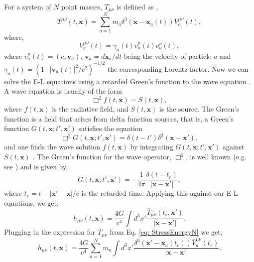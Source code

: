 \documentclass[12pt,a4paper]{report}
\theoremstyle{plain}
\theoremstyle{definition}
\theoremstyle{remark}
\newcommand{\munu}{\mu\nu}
\begin{document}
For a system of $N$ point masses, $T_{\munu}$ is defined as \cite{Christodoulou_2023b},
\begin{equation} \label{eq: StressEnergyN}
    T^{\mu \nu} (t,\bm{x}) = \sum_{a=1}^N m_a  \delta^{3} (\bm{x} - \bm{x}_a(t)) V_a^{\mu \nu} (t),
\end{equation}
where,
\begin{equation}
    V^{\mu \nu}_a(t) = \gamma_a (t) v_{a}^{\mu}(t) v_{a}^{ \nu}(t),
\end{equation}
where $v^{\mu}_a(t) = (c, \bm{v}_a )$, $\bm{v}_a= d\bm x_a / dt$ being the velocity of particle $a$ and $\gamma_a(t) =  (1 - \vert\bm{v}_a(t)\vert^2/c^2)^{-1/2}$ the corresponding Lorentz factor.
Now we can solve the E-L equations using a retarded Green's function to the wave equation \cite{Flanagan_2005, poisson_will_2014}. A wave equation is usually of the form
\begin{equation}
    \Box^2 f(t, \bm{x}) = S(t,\bm{x}),
\end{equation}
where $f(t, \bm{x})$ is the radiative field, and $S(t,\bm{x})$ is the source. The Green's function is a field that arises from delta function sources, that is, a Green's function $G(t, \bm{x}; t', \bm{x'})$ satisfies the equation
\begin{equation}
    \Box^2G(t, \bm{x}; t', \bm{x'}) = \delta(t - t')\delta^{3} (\bm{x} - \bm{x'}),
\end{equation}
and one finds the wave solution $f(t, \bm{x})$ by integrating $G(t, \bm{x}; t', \bm{x'})$ against $S(t,\bm{x})$ \cite{Flanagan_2005}. The Green's function for the wave operator, $\Box^2$, is well known (e.g. see \citet[§6.4]{Jackson_1999}) and is given by,
\begin{equation}
    G(t, \bm{x}; t', \bm{x'}) = -\frac{1}{4\pi}\frac{\delta(t - t_r)}{|\bm{x} - \bm{x'}|},
\end{equation}
where $t_r = t - |\bm{x'} - \bm{x}|/c$ is the retarded time. Applying this against our E-L equations, we get,
\begin{equation}
    h_{\munu}(t, \bm{x}) = \frac{4G}{c^4} \int d^3x' \frac{\bar{T}_{\munu}(t_r,\bm{x'})}{|\bm{x} - \bm{x'}|}.
\end{equation}
Plugging in the expression for $T_{\munu}$ from Eq. \ref{eq: StressEnergyN} we get,
\begin{equation}
    h_{\munu}(t, \bm{x}) = \frac{4G}{c^4} \sum_{a=1}^N m_a \int d^3x' \frac{\delta^{3} (\bm{x'} - \bm{x}_a(t_r)) \bar{V}_a^{\mu \nu} (t_r)}{|\bm{x} - \bm{x'}|}.
\end{equation}
\end{document}
